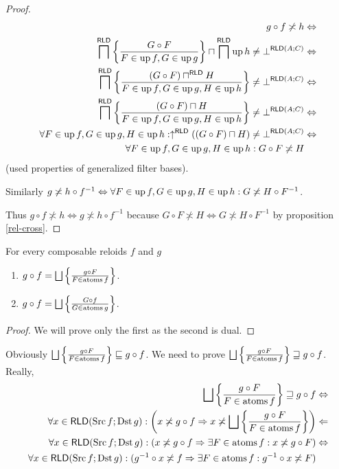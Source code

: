 \begin{proof}
~
\begin{align*}
g\circ f\not\asymp h & \Leftrightarrow\\
\bigsqcap^{\mathsf{RLD}}\left\{ \frac{G\circ F}{F\in\operatorname{up} f,G\in\operatorname{up} g}\right\}\sqcap\bigsqcap^{\mathsf{RLD}}\operatorname{up} h\ne\bot^{\mathsf{RLD}(A;C)} & \Leftrightarrow\\
\bigsqcap^{\mathsf{RLD}}\left\{ \frac{(G\circ F)\sqcap^{\mathsf{RLD}} H}{F\in\operatorname{up} f,G\in\operatorname{up} g,H\in\operatorname{up} h}\right\}\ne\bot^{\mathsf{RLD}(A;C)} & \Leftrightarrow\\
\bigsqcap^{\mathsf{RLD}}\left\{ \frac{(G\circ F)\sqcap H}{F\in\operatorname{up} f,G\in\operatorname{up} g,H\in\operatorname{up} h}\right\}\ne\bot^{\mathsf{RLD}(A;C)} & \Leftrightarrow\\
\forall F\in\operatorname{up} f,G\in\operatorname{up} g,H\in\operatorname{up} h:\uparrow^{\mathsf{RLD}}((G\circ F)\sqcap H)\ne\bot^{\mathsf{RLD}(A;C)} & \Leftrightarrow\\
\forall F\in\operatorname{up} f,G\in\operatorname{up} g,H\in\operatorname{up} h:G\circ F\not\asymp H
\end{align*}
(used properties of generalized filter bases).

Similarly $g\not\asymp h\circ f^{-1}\Leftrightarrow\forall F\in\operatorname{up} f,G\in\operatorname{up} g,H\in\operatorname{up} h:G\not\asymp H\circ F^{-1}$.

Thus $g\circ f\nasymp h\Leftrightarrow g\nasymp h\circ f^{-1}$ because
$G\circ F\nasymp H\Leftrightarrow G\nasymp H\circ F^{-1}$ by proposition
\ref{rel-cross}.\end{proof}
\begin{thm}
For every composable reloids $f$ and $g$
\begin{enumerate}
\item $g\circ f=\bigsqcup\left\{ \frac{g\circ F}{F\in\operatorname{atoms} f}\right\}$.
\item $g\circ f=\bigsqcup\left\{ \frac{G\circ f}{G\in\operatorname{atoms} g}\right\}$.
\end{enumerate}
\end{thm}
\begin{proof}
We will prove only the first as the second is dual.
\end{proof}
Obviously $\bigsqcup\left\{ \frac{g\circ F}{F\in\operatorname{atoms} f}\right\}\sqsubseteq g\circ f$. We need to prove $\bigsqcup\left\{ \frac{g\circ F}{F\in\operatorname{atoms} f}\right\}\sqsupseteq g\circ f$.
Really,
\begin{align*}
\bigsqcup\left\{ \frac{g\circ F}{F\in\operatorname{atoms} f}\right\}\sqsupseteq g\circ f & \Leftrightarrow\\
\forall x\in\mathsf{RLD}(\operatorname{Src} f;\operatorname{Dst} g):\left(x\not\asymp g\circ f\Rightarrow x\not\asymp\bigsqcup\left\{ \frac{g\circ F}{F\in\operatorname{atoms} f}\right\}\right) & \Leftarrow\\
\forall x\in\mathsf{RLD}(\operatorname{Src} f;\operatorname{Dst} g):\left(x\not\asymp g\circ f\Rightarrow \exists F\in\operatorname{atoms} f:x\not\asymp g\circ F\right) & \Leftrightarrow\\
\forall x\in\mathsf{RLD}(\operatorname{Src} f;\operatorname{Dst} g):(g^{-1}\circ x\not\asymp f\Rightarrow \exists F\in\operatorname{atoms} f:g^{-1}\circ x\not\asymp F)
\end{align*}
